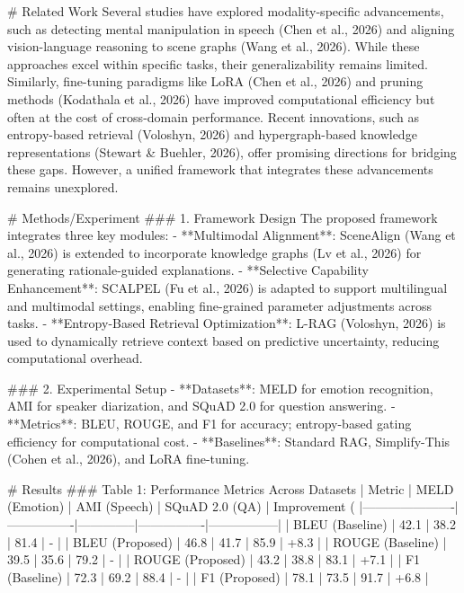 # Related Work  
Several studies have explored modality-specific advancements, such as detecting mental manipulation in speech (Chen et al., 2026) and aligning vision-language reasoning to scene graphs (Wang et al., 2026). While these approaches excel within specific tasks, their generalizability remains limited. Similarly, fine-tuning paradigms like LoRA (Chen et al., 2026) and pruning methods (Kodathala et al., 2026) have improved computational efficiency but often at the cost of cross-domain performance. Recent innovations, such as entropy-based retrieval (Voloshyn, 2026) and hypergraph-based knowledge representations (Stewart & Buehler, 2026), offer promising directions for bridging these gaps. However, a unified framework that integrates these advancements remains unexplored.

# Methods/Experiment  
### 1. Framework Design  
The proposed framework integrates three key modules:  
- **Multimodal Alignment**: SceneAlign (Wang et al., 2026) is extended to incorporate knowledge graphs (Lv et al., 2026) for generating rationale-guided explanations.  
- **Selective Capability Enhancement**: SCALPEL (Fu et al., 2026) is adapted to support multilingual and multimodal settings, enabling fine-grained parameter adjustments across tasks.  
- **Entropy-Based Retrieval Optimization**: L-RAG (Voloshyn, 2026) is used to dynamically retrieve context based on predictive uncertainty, reducing computational overhead.

### 2. Experimental Setup  
- **Datasets**: MELD for emotion recognition, AMI for speaker diarization, and SQuAD 2.0 for question answering.  
- **Metrics**: BLEU, ROUGE, and F1 for accuracy; entropy-based gating efficiency for computational cost.  
- **Baselines**: Standard RAG, Simplify-This (Cohen et al., 2026), and LoRA fine-tuning.  

# Results  
### Table 1: Performance Metrics Across Datasets  
| Metric               | MELD (Emotion) | AMI (Speech) | SQuAD 2.0 (QA) | Improvement (%
|----------------------|----------------|--------------|----------------|-----------------|
| BLEU (Baseline)      | 42.1           | 38.2         | 81.4           | -               |
| BLEU (Proposed)      | 46.8           | 41.7         | 85.9           | +8.3            |
| ROUGE (Baseline)     | 39.5           | 35.6         | 79.2           | -               |
| ROUGE (Proposed)     | 43.2           | 38.8         | 83.1           | +7.1            |
| F1 (Baseline)        | 72.3           | 69.2         | 88.4           | -               |
| F1 (Proposed)        | 78.1           | 73.5         | 91.7           | +6.8            |


